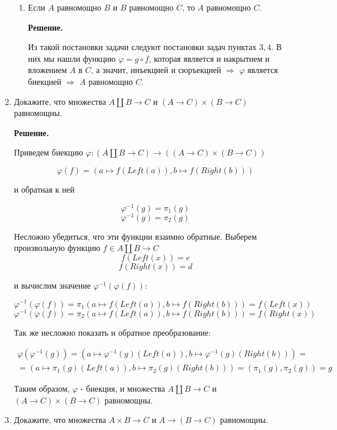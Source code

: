 \documentclass[draft]{article}
\begin{document}
\begin{enumerate}
\begin{enumerate}
\item Если $A$ равномощно $B$ и $B$ равномощно $C$, то $A$ равномощно $C$.

\textbf{Решение.} 

Из такой постановки задачи следуют постановки задач пунктах $3, 4$. В них мы нашли функцию 
$\varphi = g \circ f$, которая является и накрытием и вложением $A$ в $C$, а значит, инъекцией 
и сюръекцией $\Rightarrow$ $\varphi$ является биекцией $\Rightarrow$ $A$ равномощно $C$.

\end{enumerate}

\item Докажите, что множества $A \amalg B \to C$ и $(A \to C) \times (B \to C)$ равномощны.

\textbf{Решение.} 

Приведем биекцию $\varphi : (A \amalg B \to C) \rightarrow ((A \to C) \times (B \to C))$

$$\varphi(f) = (a \mapsto f(Left(a)), b \mapsto f(Right(b)))$$

и обратная к ней

$$\varphi^{-1}(g) = \pi_1(g)$$
$$\varphi^{-1}(g) = \pi_2(g)$$

Несложно убедиться, что эти функции взаимно обратные.
Выберем произвольную функцию $f\in A \amalg B \to C$
$$f(Left(x)) = e$$
$$f(Right(x)) = d$$

и вычислим значение $\varphi^{-1}(\varphi(f))$:

$$\varphi^{-1}(\varphi(f)) = \pi_1(a \mapsto f(Left(a)), b \mapsto f(Right(b))) = f(Left(x))$$
$$\varphi^{-1}(\varphi(f)) = \pi_2(a \mapsto f(Left(a)), b \mapsto f(Right(b))) = f(Right(x))$$

Так же несложно показать и обратное преобразование:

\begin{equation*}
\begin{array} {lcl}
	\varphi(\varphi^{-1}(g)) = (a \mapsto \varphi^{-1}(g)(Left(a)), b \mapsto \varphi^{-1}(g)(Right(b))) = \\
	= (a \mapsto \pi_1(g)(Left(a)), b \mapsto \pi_2(g)(Right(b))) = (\pi_1(g), \pi_2(g)) = g
\end{array}
\end{equation*}

Таким образом, $\varphi$ - биекция, и множества $A \amalg B \to C$ и $(A \to C) \times (B \to C)$ равномощны.

\item Докажите, что множества $A \times B \to C$ и $A \to (B \to C)$ равномощны.


\end{enumerate}
\end{document}
